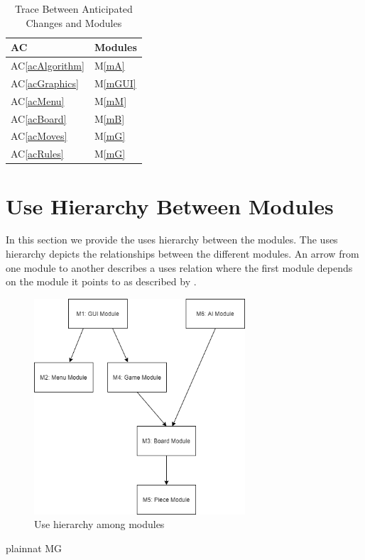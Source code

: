 \documentclass[12pt, titlepage]{article}
\newcommand{\acref}[1]{AC\ref{#1}}
\newcommand{\mref}[1]{M\ref{#1}}
\begin{document}
\begin{table}[H]
\centering
\begin{tabular}{p{} p{}}
\toprule
\textbf{AC} & \textbf{Modules}\\
\midrule
\acref{acAlgorithm} & \mref{mA}\\
\acref{acGraphics} & \mref{mGUI}\\
\acref{acMenu} & \mref{mM}\\
\acref{acBoard} & \mref{mB}\\
\acref{acMoves} & \mref{mG}\\
\acref{acRules} & \mref{mG}\\
\bottomrule
\end{tabular}
\caption{Trace Between Anticipated Changes and Modules}
\label{TblACT}
\end{table}

\newpage
\section{Use Hierarchy Between Modules} \label{SecUse}

In this section we provide the uses hierarchy between the modules. The uses hierarchy depicts the relationships between the different modules. An arrow from one module to another describes a uses relation where the first module depends on the module it points to as described by \citet{Parnas1978}. 

\begin{figure}[H]
\centering
\includegraphics[width=0.7\textwidth]{UsesHierarchy.png}
\caption{Use hierarchy among modules}
\label{FigUH}
\end{figure}


 {plainnat}
 {MG}
\end{document}
